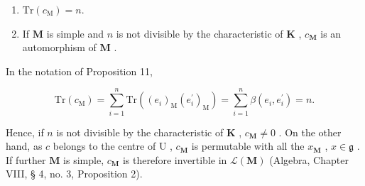 \begin{enumerate}
\def\labelenumi{(\alph{enumi})}
\item
  \(\mathrm{Tr}(c_{\mathrm{M}})=n.\)
\item
  If \(\mathbf{M}\) is simple and \(n\) is not divisible by the characteristic of \(\mathbf{K}\) , \(c_{\mathbf{M}}\) is an automorphism of \(\mathbf{M}\) .
\end{enumerate}

In the notation of Proposition 11,

\[
\mathrm{Tr} (c _ {\mathrm{M}}) = \sum_ {i = 1} ^ {n} \mathrm{Tr} ((e _ {i}) _ {\mathrm{M}} (e _ {i} ^ {\prime}) _ {\mathrm{M}}) = \sum_ {i = 1} ^ {n} \beta (e _ {i}, e _ {i} ^ {\prime}) = n.
\]

Hence, if \(n\) is not divisible by the characteristic of \(\mathbf{K}\) , \(c_{\mathbf{M}} \neq 0\) . On the other hand, as \(c\) belongs to the centre of \(\mathrm{U}\) , \(c_{\mathbf{M}}\) is permutable with all the \(x_{\mathbf{M}}\) , \(x \in \mathfrak{g}\) . If further \(\mathbf{M}\) is simple, \(c_{\mathbf{M}}\) is therefore invertible in \(\mathcal{L}(\mathbf{M})\) (Algebra, Chapter VIII, § 4, no. 3, Proposition 2).

